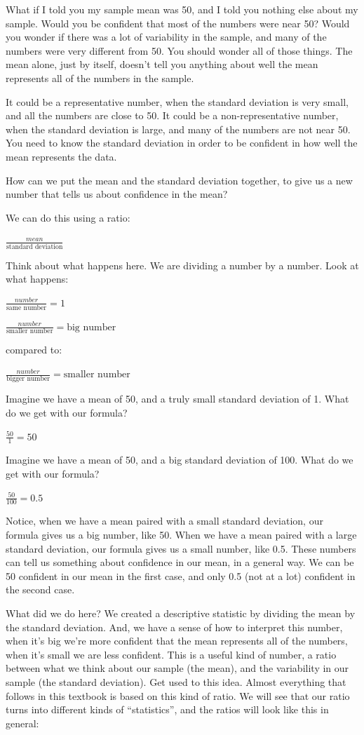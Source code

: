 \documentclass[
]{book}
\begin{document}
What if I told you my sample mean was 50, and I told you nothing else about my sample. Would you be confident that most of the numbers were near 50? Would you wonder if there was a lot of variability in the sample, and many of the numbers were very different from 50. You should wonder all of those things. The mean alone, just by itself, doesn't tell you anything about well the mean represents all of the numbers in the sample.

It could be a representative number, when the standard deviation is very small, and all the numbers are close to 50. It could be a non-representative number, when the standard deviation is large, and many of the numbers are not near 50. You need to know the standard deviation in order to be confident in how well the mean represents the data.

How can we put the mean and the standard deviation together, to give us a new number that tells us about confidence in the mean?

We can do this using a ratio:

\(\frac{mean}{\text{standard deviation}}\)

Think about what happens here. We are dividing a number by a number. Look at what happens:

\(\frac{number}{\text{same number}} = 1\)

\(\frac{number}{\text{smaller number}} = \text{big number}\)

compared to:

\(\frac{number}{\text{bigger number}} = \text{smaller number}\)

Imagine we have a mean of 50, and a truly small standard deviation of 1. What do we get with our formula?

\(\frac{50}{1} = 50\)

Imagine we have a mean of 50, and a big standard deviation of 100. What do we get with our formula?

\(\frac{50}{100} = 0.5\)

Notice, when we have a mean paired with a small standard deviation, our formula gives us a big number, like 50. When we have a mean paired with a large standard deviation, our formula gives us a small number, like 0.5. These numbers can tell us something about confidence in our mean, in a general way. We can be 50 confident in our mean in the first case, and only 0.5 (not at a lot) confident in the second case.

What did we do here? We created a descriptive statistic by dividing the mean by the standard deviation. And, we have a sense of how to interpret this number, when it's big we're more confident that the mean represents all of the numbers, when it's small we are less confident. This is a useful kind of number, a ratio between what we think about our sample (the mean), and the variability in our sample (the standard deviation). Get used to this idea. Almost everything that follows in this textbook is based on this kind of ratio. We will see that our ratio turns into different kinds of ``statistics'', and the ratios will look like this in general:
\end{document}
